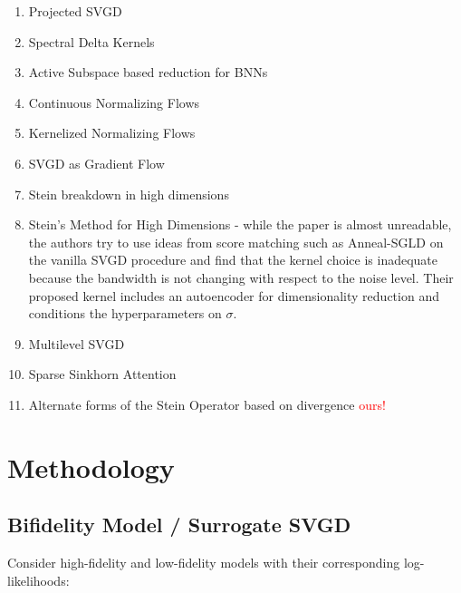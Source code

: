\documentclass[12pt]{article}
\renewcommand{\[}{\left[}
\renewcommand{\]}{\right]}
\renewcommand{\(}{\left(}
\renewcommand{\)}{\right)}
\begin{document}
\begin{enumerate}
    \item Projected SVGD \cite{chen_projected_2020}

    \item Spectral Delta Kernels \cite{lazaro-gredilla_sparse_2010}

    \item Active Subspace based reduction for BNNs \cite{jantre_learning_2023}

    \item Continuous Normalizing Flows \cite{grathwohl_ffjord_2018}

    \item Kernelized Normalizing Flows \cite{english_kernelised_2024}

    \item SVGD as Gradient Flow \cite{liu_stein_2017}

    \item Stein breakdown in high dimensions \cite{ba_towards_2019}

    \item Stein's Method for High Dimensions \cite{chang_kernel_2020} - while the paper is almost unreadable, the authors try to use ideas from score matching such as Anneal-SGLD on the vanilla SVGD procedure and find that the kernel choice is inadequate because the bandwidth is not changing with respect to the noise level. Their proposed kernel includes an autoencoder for dimensionality reduction and conditions the hyperparameters on $\sigma$.

    \item Multilevel SVGD \cite{alsup_multilevel_2022}

    \item Sparse Sinkhorn Attention \cite{tay_sparse_2020}

    \item Alternate forms of the Stein Operator based on divergence \textcolor{red}{ours!}
\end{enumerate}

\section{Methodology}

\subsection{Bifidelity Model / Surrogate SVGD}

Consider high-fidelity and low-fidelity models with their corresponding log-likelihoods:
\end{document}
